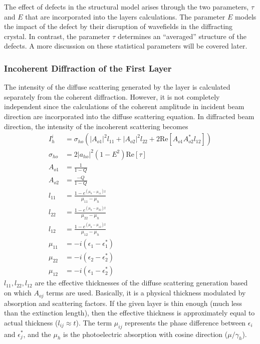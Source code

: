 The effect of defects in the structural model arises through the two parameters, $\tau$ and $E$ that are incorporated into the layers calculations. The parameter $E$  models the impact of the defect by their disruption of wavefields in the diffracting crystal. In contrast, the parameter $\tau$ determines an ``averaged'' structure of the defects. A more discussion on these statistical parameters will be covered later.


  
\subsubsection{Incoherent Diffraction of the First Layer}

The intensity of the diffuse scattering generated by the layer is calculated separately from the coherent diffraction.  However, it is not completely independent since the calculations of the coherent amplitude in incident beam direction are incorporated into the diffuse scattering equation. In diffracted beam direction, the intensity of the incoherent scattering becomes
\begin{align}
I^i_h &= \sigma_{ho} \left(  |A_{o1}|^2 l_{11} + |A_{o2}|^2 l_{22} + 2 \text{Re}[A_{o1} A_{o2}^* l_{12}]\right)\\
\sigma_{ho}&=2 |a_{ho}|^2(1-E^2) \text{Re}[\tau]\\
A_{o1} &= \frac{1}{1-Q}\\
A_{o2} &= \frac{-Q}{1-Q}\\
l_{11} &= \frac{1-e^{(\mu_h -\mu_{11}) t }}{\mu_{11} - \mu_h}\\
l_{22} &= \frac{1-e^{(\mu_h -\mu_{22}) t }}{\mu_{22} - \mu_h}\\
l_{12} &= \frac{1-e^{(\mu_h -\mu_{12}) t }}{\mu_{12} - \mu_h}\\
\mu_{11} &= -i(\epsilon_1 - \epsilon_1^*)\\
\mu_{22} &= -i(\epsilon_2 - \epsilon_2^*)\\
\mu_{12} &= -i(\epsilon_1 - \epsilon_2^*)
\end{align}
$l_{11},l_{22},l_{12}$ are the effective thicknesses of the diffuse scattering generation based on which $A_{oj}$ terms are used.  Basically, it is a physical thickness modulated by absorption and scattering factors.  If the given layer is thin enough (much less than the extinction length), then the effective thickness is approximately equal to actual thickness ($l_{ij} \approx t$).   The term $\mu_{ij}$ represents the phase difference between $\epsilon_i$ and $\epsilon_j^*$, and the  $\mu_h$ is the photoelectric absorption with cosine direction ($\mu/\gamma_h$).
 
